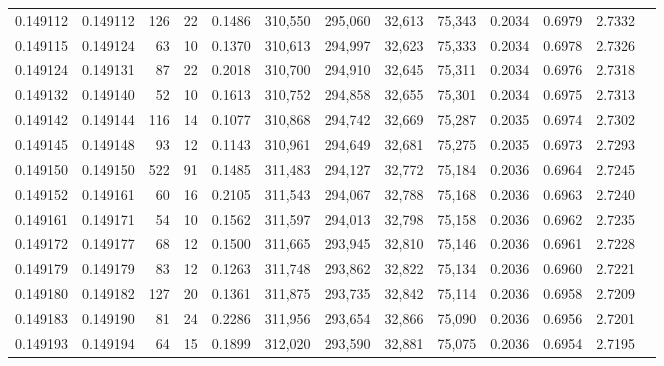 \begin{tabular}{rrrrrrrrrrrrr}
0.149112 & 0.149112 &   126 &  22 &                                     0.1486 & 310,550 & 295,060 &  32,613 &  75,343 & 0.2034 & 0.6979 & 2.7332 \\
0.149115 & 0.149124 &    63 &  10 &                                     0.1370 & 310,613 & 294,997 &  32,623 &  75,333 & 0.2034 & 0.6978 & 2.7326 \\
0.149124 & 0.149131 &    87 &  22 &                                     0.2018 & 310,700 & 294,910 &  32,645 &  75,311 & 0.2034 & 0.6976 & 2.7318 \\
0.149132 & 0.149140 &    52 &  10 &                                     0.1613 & 310,752 & 294,858 &  32,655 &  75,301 & 0.2034 & 0.6975 & 2.7313 \\
0.149142 & 0.149144 &   116 &  14 &                                     0.1077 & 310,868 & 294,742 &  32,669 &  75,287 & 0.2035 & 0.6974 & 2.7302 \\
0.149145 & 0.149148 &    93 &  12 &                                     0.1143 & 310,961 & 294,649 &  32,681 &  75,275 & 0.2035 & 0.6973 & 2.7293 \\
0.149150 & 0.149150 &   522 &  91 &                                     0.1485 & 311,483 & 294,127 &  32,772 &  75,184 & 0.2036 & 0.6964 & 2.7245 \\
0.149152 & 0.149161 &    60 &  16 &                                     0.2105 & 311,543 & 294,067 &  32,788 &  75,168 & 0.2036 & 0.6963 & 2.7240 \\
0.149161 & 0.149171 &    54 &  10 &                                     0.1562 & 311,597 & 294,013 &  32,798 &  75,158 & 0.2036 & 0.6962 & 2.7235 \\
0.149172 & 0.149177 &    68 &  12 &                                     0.1500 & 311,665 & 293,945 &  32,810 &  75,146 & 0.2036 & 0.6961 & 2.7228 \\
0.149179 & 0.149179 &    83 &  12 &                                     0.1263 & 311,748 & 293,862 &  32,822 &  75,134 & 0.2036 & 0.6960 & 2.7221 \\
0.149180 & 0.149182 &   127 &  20 &                                     0.1361 & 311,875 & 293,735 &  32,842 &  75,114 & 0.2036 & 0.6958 & 2.7209 \\
0.149183 & 0.149190 &    81 &  24 &                                     0.2286 & 311,956 & 293,654 &  32,866 &  75,090 & 0.2036 & 0.6956 & 2.7201 \\
0.149193 & 0.149194 &    64 &  15 &                                     0.1899 & 312,020 & 293,590 &  32,881 &  75,075 & 0.2036 & 0.6954 & 2.7195 \\

\end{tabular}
